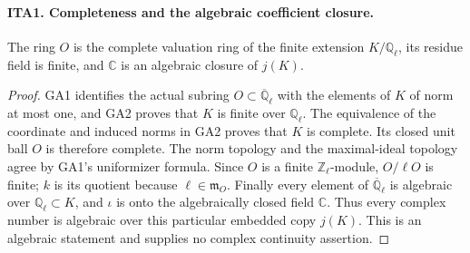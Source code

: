 \paragraph{ITA1. Completeness and the algebraic coefficient closure.}
\label{claim:ITA1}
The ring $O$ is the complete valuation ring of the finite extension
$K/\mathbb Q_\ell$, its residue field is finite, and
$\mathbb C$ is an algebraic closure of $j(K)$.
\begin{proof}
GA1 identifies the actual subring $O\subset\overline{\mathbb Q}_\ell$
with the elements of $K$ of norm at most one, and GA2 proves
that $K$ is finite over $\mathbb Q_\ell$.  The equivalence of
the coordinate and induced norms in GA2 proves that $K$ is
complete.  Its closed unit ball $O$ is therefore complete.
The norm topology and the maximal-ideal topology agree by
GA1's uniformizer formula.  Since $O$ is a finite
$\mathbb Z_\ell$-module, $O/\ell O$ is finite; $k$ is its
quotient because $\ell\in\mathfrak m_O$.  Finally every
element of $\overline{\mathbb Q}_\ell$ is algebraic over
$\mathbb Q_\ell\subset K$, and $\iota$ is onto the
algebraically closed field $\mathbb C$.  Thus every complex
number is algebraic over this particular embedded copy $j(K)$.
This is an algebraic statement and supplies no complex
continuity assertion.
\end{proof}

